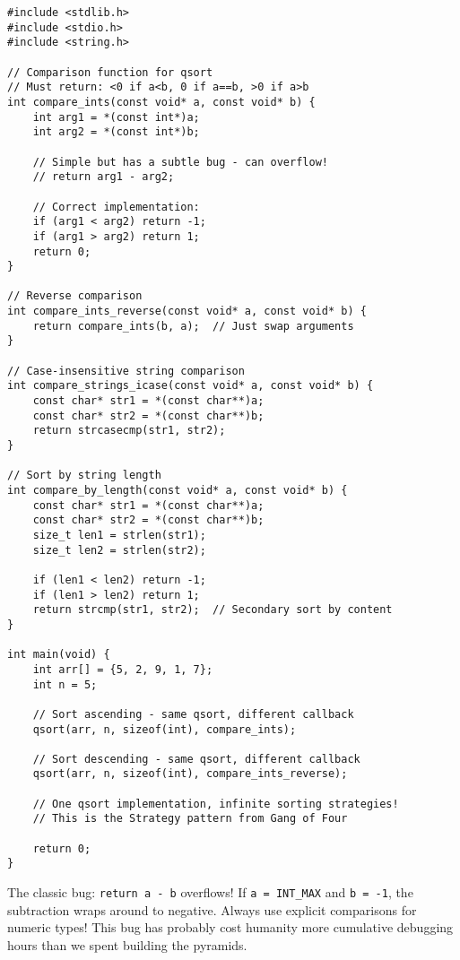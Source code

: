 \begin{lstlisting}
#include <stdlib.h>
#include <stdio.h>
#include <string.h>

// Comparison function for qsort
// Must return: <0 if a<b, 0 if a==b, >0 if a>b
int compare_ints(const void* a, const void* b) {
    int arg1 = *(const int*)a;
    int arg2 = *(const int*)b;

    // Simple but has a subtle bug - can overflow!
    // return arg1 - arg2;

    // Correct implementation:
    if (arg1 < arg2) return -1;
    if (arg1 > arg2) return 1;
    return 0;
}

// Reverse comparison
int compare_ints_reverse(const void* a, const void* b) {
    return compare_ints(b, a);  // Just swap arguments
}

// Case-insensitive string comparison
int compare_strings_icase(const void* a, const void* b) {
    const char* str1 = *(const char**)a;
    const char* str2 = *(const char**)b;
    return strcasecmp(str1, str2);
}

// Sort by string length
int compare_by_length(const void* a, const void* b) {
    const char* str1 = *(const char**)a;
    const char* str2 = *(const char**)b;
    size_t len1 = strlen(str1);
    size_t len2 = strlen(str2);

    if (len1 < len2) return -1;
    if (len1 > len2) return 1;
    return strcmp(str1, str2);  // Secondary sort by content
}

int main(void) {
    int arr[] = {5, 2, 9, 1, 7};
    int n = 5;

    // Sort ascending - same qsort, different callback
    qsort(arr, n, sizeof(int), compare_ints);

    // Sort descending - same qsort, different callback
    qsort(arr, n, sizeof(int), compare_ints_reverse);

    // One qsort implementation, infinite sorting strategies!
    // This is the Strategy pattern from Gang of Four

    return 0;
}
\end{lstlisting}

\begin{warningbox}
The classic bug: \texttt{return a - b} overflows! If \texttt{a = INT\_MAX} and \texttt{b = -1}, the subtraction wraps around to negative. Always use explicit comparisons for numeric types! This bug has probably cost humanity more cumulative debugging hours than we spent building the pyramids.
\end{warningbox}

